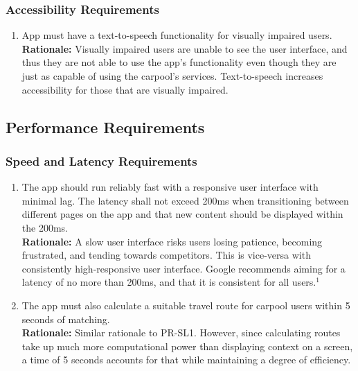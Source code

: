 \documentclass[]{article}
\begin{document}
\subsubsection{Accessibility Requirements}
\label{ssub:accessibility_requirements}
\begin{enumerate}[{UH-A}1. ]
	\item App must have a text-to-speech functionality for visually impaired users.\\
	{\bf Rationale:} Visually impaired users are unable to see the user interface, and thus they are not able to use the app's functionality even though they are just as capable of using the carpool's services. Text-to-speech increases accessibility for those that are visually impaired.
\end{enumerate}


\subsection{Performance Requirements}
\label{sub:performance_requirements}

\subsubsection{Speed and Latency Requirements}
\label{ssub:speed_and_latency_requirements}
\begin{enumerate}[{PR-SL}1. ]
	\item The app should run reliably fast with a responsive user interface with minimal lag. The latency shall not exceed 200ms when transitioning between different pages on the app and that new content should be displayed within the 200ms.\\
	{\bf Rationale:} A slow user interface risks users losing patience, becoming frustrated, and tending towards competitors. This is vice-versa with consistently high-responsive user interface. Google recommends aiming for a latency of no more than 200ms, and that it is consistent for all users.$^1$
	\item The app must also calculate a suitable travel route for carpool users within 5 seconds of matching.\\
	{\bf Rationale:} Similar rationale to PR-SL1. However, since calculating routes take up much more computational power than displaying context on a screen, a time of 5 seconds accounts for that while maintaining a degree of efficiency.
\end{enumerate}
\end{document}
